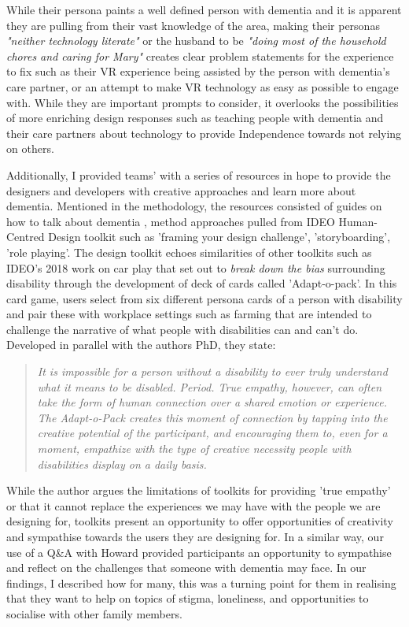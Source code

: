While their persona paints a well defined person with dementia and it is apparent they are pulling from their vast knowledge of the area, making their personas \textit{"neither technology literate"} or the husband to be \textit{"doing most of the household chores and caring for Mary"} creates clear problem statements for the experience to fix such as their VR experience being assisted by the person with dementia's care partner, or an attempt to make VR technology as easy as possible to engage with. While they are important prompts to consider, it overlooks the possibilities of more enriching design responses such as teaching people with dementia and their care partners about technology to provide Independence towards not relying on others. 

Additionally, I provided teams' with a  series of resources in hope to provide the designers and developers with creative approaches and learn more about dementia. Mentioned in the methodology, the resources consisted of guides on how to talk about dementia \citep{diaries_deep_2020}, method approaches pulled from IDEO Human-Centred Design toolkit \citep{ideo_2021} such as 'framing your design challenge', 'storyboarding', 'role playing'. The design toolkit  echoes similarities of other toolkits such as IDEO's 2018 work on car play that set out  to \textit{break down the bias} surrounding disability through the development of deck of cards called 'Adapt-o-pack'. In this card game, users select from six different persona cards of a person with disability and pair these with workplace settings such as farming that are intended to challenge the narrative of what people with disabilities can and can't do. Developed in parallel with the authors PhD, they state:
\begin{quote}
\textit{
It is impossible for a person without a disability to ever truly understand what it means to be disabled. Period. True empathy, however, can often take the form of human connection over a shared emotion or experience. The Adapt-o-Pack creates this moment of connection by tapping into the creative potential of the participant, and encouraging them to, even for a moment, empathize with the type of creative necessity people with disabilities display on a daily basis.
}
\end{quote}

While the author argues the limitations of toolkits for providing 'true empathy' or that it cannot replace the experiences we may have with the people we are designing for, toolkits present an opportunity to offer opportunities of creativity and sympathise towards the users they are designing for. In a similar way, our use of a Q\&A with Howard provided participants an opportunity to sympathise and reflect on the challenges that someone with dementia may face. In our findings, I described how for many, this was a turning point for them in realising that they want to help on topics of stigma, loneliness, and opportunities to socialise with other family members. 

